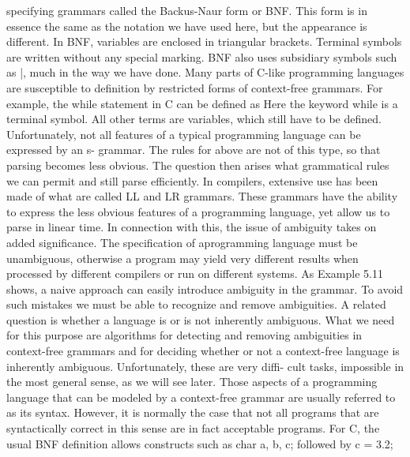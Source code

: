 \documentclass[a4paper,12pt]{extarticle}
\begin{document}
specifying grammars called the Backus-Naur form or BNF. This form is in essence
the same as the notation we have used here, but the appearance is different. In
BNF, variables are enclosed in triangular brackets. Terminal symbols are written
without any special marking. BNF also uses subsidiary symbols such as |, much in
the way we have done.\newline
Many parts of C-like programming languages are susceptible to definition by restricted
forms of context-free grammars. For example, the while statement in C can
be defined as Here the keyword while is a terminal symbol. All other terms are
variables, which still have to be defined.\newline
Unfortunately, not all features of a typical programming language can be expressed
by an s- grammar. The rules for above are not of this type, so that parsing becomes
less obvious. The question then arises what grammatical rules we can permit and
still parse efficiently. In compilers, extensive use has been made of what are called
LL and LR grammars. These grammars have the ability to express the less obvious
features of a programming language, yet allow us to parse in linear time.\newline
In connection with this, the issue of ambiguity takes on added significance. The
specification of aprogramming language must be unambiguous, otherwise a program
may yield very different results when processed by different compilers or run
on different systems. As Example 5.11 shows, a naive approach can easily introduce
ambiguity in the grammar. To avoid such mistakes we must be able to recognize
and remove ambiguities. A related question is whether a language is or is not inherently
ambiguous. What we need for this purpose are algorithms for detecting and
removing ambiguities in context-free grammars and for deciding whether or not a
context-free language is inherently ambiguous. Unfortunately, these are very diffi-
cult tasks, impossible in the most general sense, as we will see later.\newline
Those aspects of a programming language that can be modeled by a context-free
grammar are usually referred to as its syntax. However, it is normally the case that
not all programs that are syntactically correct in this sense are in fact acceptable
programs. For C, the usual BNF definition allows constructs such as\newline
char a, b, c; followed by\newline
c = 3.2;\newline
\end{document}
